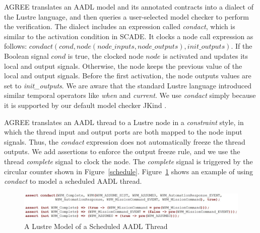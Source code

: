 AGREE translates an AADL model and its annotated contracts into a dialect \cite{jkind} of the Lustre language, and then queries a user-selected model checker to perform the verification. The dialect includes an expression called \emph{condact}, which is similar to the activation condition in SCADE. It clocks a node call expression as follows: 
$
condact (cond, node(node\_inputs, node\_outputs), init\_outputs)
$.
If the Boolean signal $cond$ is true, the clocked node $node$ is activated and updates its local and output signals. Otherwise, the node keeps the previous value of the local and output signals. Before the first activation, the node outputs values are set to \emph{init\_outputs}. %
We are aware that the standard Lustre language introduced similar temporal operators like \emph{when} and \emph{current}. We use \emph{condact} simply because it is supported by our default model checker JKind \cite{jkind}.

AGREE translates an AADL thread to a Lustre node in a \emph{constraint} style, in which the thread input and output ports are both mapped to the node input signals. Thus, the \emph{condact} expression does not automatically freeze the thread outputs. We add assertions to enforce the output freeze rule, and we use the thread \emph{complete} signal to clock the node. The \emph{complete} signal is triggered by the circular counter shown in Figure~\ref{schedule}. Figure~\ref{WPMlustre} shows an example of using \emph{condact} to model a scheduled AADL thread. 

\begin{figure}[t!]
\centering
\includegraphics[width=120mm]{lustreAsync5.jpg}
\caption{A Lustre Model of a Scheduled AADL Thread \label{WPMlustre}}
\end{figure}

%
%

